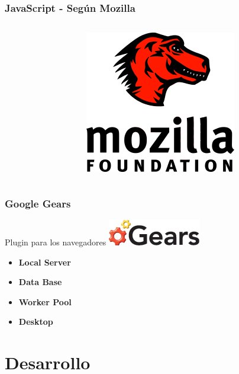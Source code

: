 \documentclass{beamer}
\begin{document}
\begin{frame}

    \frametitle{JavaScript - Según Mozilla}
    \begin{columns}[c]
         \begin{column}{5cm}
         \end{column}
         \begin{column}{5cm}
            \includegraphics[scale=1.2]{mozilla.png}
            
    
         \end{column}
     \end{columns}    
\end{frame}

\begin{frame}
    \frametitle{Google Gears}
    \par{
        Plugin para los navegadores
        \hfill
        \includegraphics[scale=0.3]{gears.png}
    }
    \begin{itemize}
        \item{\bf Local Server}
        \item{\bf Data Base}
        \item{\bf Worker Pool}
        \item{\bf Desktop}
    \end{itemize}
\end{frame}

\section{Desarrollo}
\end{document}
